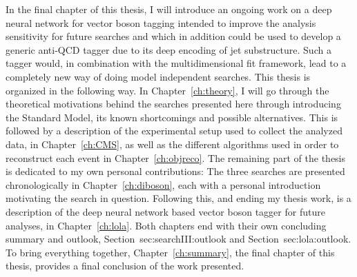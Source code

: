 \newline
\newline
In the final chapter of this thesis, I will introduce an ongoing work on a deep neural network for vector boson tagging intended to improve the analysis sensitivity for future searches and which in addition could be used to develop a generic anti-QCD tagger due to its deep encoding of jet substructure. Such a tagger would, in combination with the multidimensional fit framework, lead to a completely new way of doing model independent searches.
\newline
\newline
This thesis is organized in the following way. In Chapter~\ref{ch:theory}, I will go through the theoretical motivations behind the searches presented here through introducing the Standard Model, its known shortcomings and possible alternatives. This is followed by a description of the experimental setup used to collect the analyzed data, in Chapter~\ref{ch:CMS}, as well as the different algorithms used in order to reconstruct each event in Chapter~\ref{ch:objreco}. The remaining part of the thesis is dedicated to my own personal contributions: The three searches are presented chronologically in Chapter~\ref{ch:diboson}, each with a personal introduction motivating the search in question. Following this, and ending my thesis work, is a description of the deep neural network based vector boson tagger for future analyses, in Chapter~\ref{ch:lola}. Both chapters end with their own concluding summary and outlook, Section~{sec:searchIII:outlook} and Section~{sec:lola:outlook}.  To bring everything together, Chapter~\ref{ch:summary}, the final chapter of this thesis, provides a final conclusion of the work presented.
